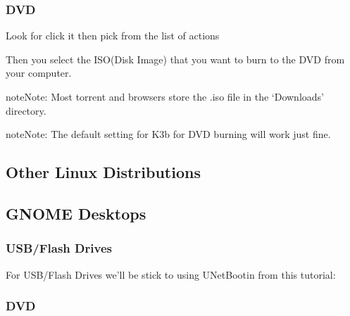 \documentclass[letterpaper,10pt,english]{sphinxmanual}
\begin{document}
\subsubsection{DVD}
\label{\detokenize{docs/installation:id2}}

\sphinxAtStartPar
Look for  click it then pick  from the list of actions


\sphinxAtStartPar
Then you select the ISO(Disk Image) that you want to burn to the DVD from your computer.

\begin{sphinxadmonition}{note}{Note:}
\sphinxAtStartPar
Most torrent and browsers store the .iso file in the ‘Downloads’ directory.
\end{sphinxadmonition}

\begin{sphinxadmonition}{note}{Note:}
\sphinxAtStartPar
The default setting for K3b for DVD burning will work just fine.
\end{sphinxadmonition}


\subsection{Other Linux Distributions}
\label{\detokenize{docs/installation:other-linux-distributions}}

\subsection{GNOME Desktops}
\label{\detokenize{docs/installation:gnome-desktops}}

\subsubsection{USB/Flash Drives}
\label{\detokenize{docs/installation:id3}}
\sphinxAtStartPar
For USB/Flash Drives we’ll be stick to using UNetBootin from this tutorial: {\hyperref[\detokenize{docs/installation:usb-drives-link}]{}}


\subsubsection{DVD}
\label{\detokenize{docs/installation:id4}}
\end{document}
